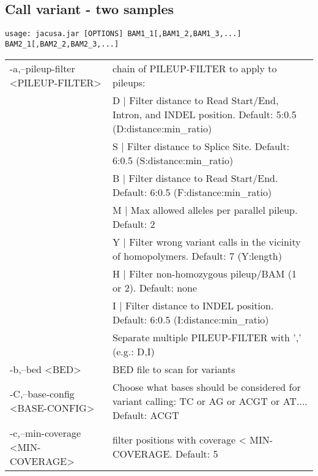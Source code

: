 \documentclass[10pt, a4paper]{article}
\begin{document}
\subsection{Call variant - two samples}
{\small
\begin{verbatim}
usage: jacusa.jar [OPTIONS] BAM1_1[,BAM1_2,BAM1_3,...] BAM2_1[,BAM2_2,BAM2_3,...]
\end{verbatim}}
\begin{table}
\centering
{\small
\begin{tabular}{p{}p{}}
 -a,--pileup-filter <PILEUP-FILTER>             & chain of PILEUP-FILTER to apply to pileups: \\
                                                & D | Filter distance to Read Start/End, Intron, and INDEL position. Default: 5:0.5 (D:distance:min\_ratio) \\
                                                & S | Filter distance to Splice Site. Default: 6:0.5 (S:distance:min\_ratio) \\
                                                & B | Filter distance to Read Start/End. Default: 6:0.5 (F:distance:min\_ratio) \\
                                                & M | Max allowed alleles per parallel pileup. Default: 2 \\ 
                                                & Y | Filter wrong variant calls in the vicinity of homopolymers. Default: 7 (Y:length) \\
                                                & H | Filter non-homozygous pileup/BAM (1 or 2). Default: none \\
                                                & I | Filter distance to INDEL position. Default: 6:0.5 (I:distance:min\_ratio) \\
                                                & Separate multiple PILEUP-FILTER with ',' (e.g.: D,I) \\
 -b,--bed <BED>									& BED file to scan for variants \\
 -C,--base-config <BASE-CONFIG> 				& Choose what bases should be considered for variant calling: TC or AG or ACGT or AT$\ldots$. Default: ACGT \\
 -c,--min-coverage <MIN-COVERAGE>               & filter positions with coverage < MIN-COVERAGE. Default: 5 \\

\end{tabular}}
\end{table}
\end{document}
